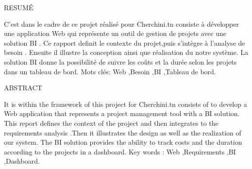\newpage
\bigskip

RESUM\'E
\bigskip
\newline

C'est dans le cadre de ce projet  r\'{e}alis\'{e} pour Cherchini.tn consiste \`{a} d\'{e}velopper une application Web qui repr\'{e}sente un
outil de gestion de projets avec une solution BI .
Ce rapport definit le contexte du projet,puis s'int\`{e}gre \`{a} l'analyse de besoin
. Ensuite il illustre la conception ainsi que r\'{e}alisation du notre syst\`{e}me.
La solution BI donne la possibilité de suivre les coûts et la durée selon les  projets dans un tableau de bord.
\newline
\bigskip
Mots cl\'{e}s: Web ,Besoin ,BI ,Tableau de bord.



\bigskip
\bigskip
\bigskip


ABSTRACT
\bigskip
\newline

It is within the framework of this project for Cherchini.tn consists of
to develop a Web application that represents a project management tool
with a BI solution. This report defines the context of the project and then integrates
to the requirements analysis .Then it illustrates the design as well as the realization
of our system. The BI solution provides the ability to track costs and
the duration according to the projects in a dashboard.
\newline
\bigskip
Key words : Web ,Requirements ,BI ,Dashboard.
